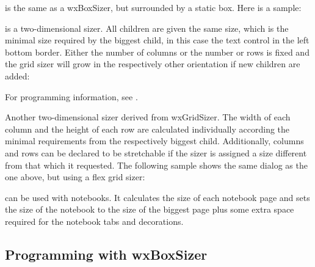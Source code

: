 \begin{center}
\end{center}


 is the same as a wxBoxSizer, but surrounded by a
static box. Here is a sample:

\begin{center}
\end{center}


 is a two-dimensional sizer. All children are given the
same size, which is the minimal size required by the biggest child, in
this case the text control in the left bottom border. Either the number
of columns or the number or rows is fixed and the grid sizer will grow
in the respectively other orientation if new children are added:

\begin{center}
\end{center}

For programming information, see .


Another two-dimensional sizer derived from
wxGridSizer. The width of each column and the height of each row
are calculated individually according the minimal requirements
from the respectively biggest child. Additionally, columns and
rows can be declared to be stretchable if the sizer is assigned
a size different from that which it requested. The following sample shows
the same dialog as the one above, but using a flex grid sizer:

\begin{center}
\end{center}


 can be used
with notebooks. It calculates the size of each
notebook page and sets the size of the notebook to the size
of the biggest page plus some extra space required for the
notebook tabs and decorations.

\subsection{Programming with wxBoxSizer}\label{boxsizerprogramming}


